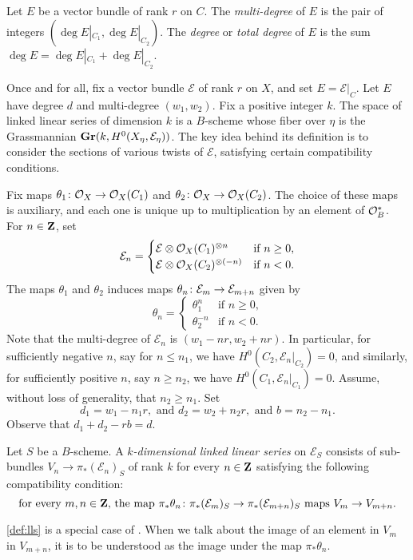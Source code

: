 Let $E$ be a vector bundle of rank $r$ on $C$.
The \emph{multi-degree} of $E$ is the pair of integers $(\deg E|_{C_1}, \deg E|_{C_2})$.
The \emph{degree} or \emph{total degree} of $E$ is the sum $\deg E = \deg E|_{C_1} + \deg E|_{C_2}$.

Once and for all, fix a vector bundle $\mathcal E$ of rank $r$ on $X$, and set $E = \mathcal E|_C$.
Let $E$ have degree $d$ and multi-degree $(w_1, w_2)$.
Fix a positive integer $k$.
The space of linked linear series of dimension $k$ is a $B$-scheme whose fiber over $\eta$ is the Grassmannian ${\bf Gr}(k, H^0(X_\eta, \mathcal E_\eta))$.
The key idea behind its definition is to consider the sections of various twists of $\mathcal E$, satisfying certain compatibility conditions.

Fix maps $\theta_1 {\colon} \mathcal O_X \to \mathcal O_X(C_1)$ and $\theta_2 {\colon} \mathcal O_X \to \mathcal O_X(C_2)$.
The choice of these maps is auxiliary, and each one is unique up to multiplication by an element of $\mathcal O_B^*$.
For $n \in {\bf Z}$, set
\[ \mathcal E_n =
  \begin{cases}
    \mathcal E \otimes \mathcal O_X(C_1)^{\otimes n} & \text{if $n \geq 0$},\\
    \mathcal E \otimes \mathcal O_X(C_2)^{\otimes (-n)}  & \text{if $n < 0$}.
  \end{cases}
\]
The maps $\theta_1$ and $\theta_2$ induces maps
$\theta_n {\colon} \mathcal E_m \to \mathcal E_{m+n}$
given by
\[
  \theta_n = 
  \begin{cases}
    \theta_1^n & \text{if $n \geq 0$,} \\
    \theta_2^{-n} & \text{if $n < 0$.}
  \end{cases}
\]
Note that the multi-degree of $\mathcal E_n$ is $(w_1 - nr, w_2 + nr)$.
In particular, for sufficiently negative $n$, say for $n \leq n_1$, we have $H^0(C_2, \mathcal E_n|_{C_2}) = 0$, and similarly, for sufficiently positive $n$, say $n \geq n_2$, we have $H^0(C_1, \mathcal E_n|_{C_1}) = 0$.
Assume, without loss of generality, that $n_2 \geq n_1$.
Set
\[ d_1 = w_1 - n_1 r, \text{ and } d_2 = w_2 + n_2 r, \text{ and } b = n_2 - n_1.\]
Observe that
$ d_1 + d_2 - rb = d$.

\begin{definition}
  \label{def:lls}
  Let $S$ be a $B$-scheme.
  A \emph{$k$-dimensional linked linear series} on $\mathcal E_S$ consists of sub-bundles $V_n \to \pi_* (\mathcal E_n)_S$ of rank $k$ for every $n \in {\bf Z}$ satisfying the following compatibility condition:
  \begin{equation}\label{lls:compatibility}
    \text{for every $m, n \in {\bf Z}$, the map }\pi_* \theta_n {\colon} \pi_* (\mathcal E_m)_S \to \pi_* (\mathcal E_{m+n})_S \text{ maps } V_m \to V_{m+n}.
  \end{equation}
\end{definition}
\autoref{def:lls} is a special case of \cite[Definition~3.3.2]{oss:14}.
When we talk about the image of an element in $V_m$ in $V_{m+n}$, it is to be understood as the image under the map $\pi_* \theta_n$.

